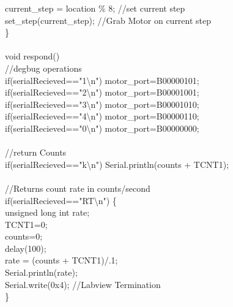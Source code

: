 {\tabto*{.5cm}	current\_step = location \% 8; \tabto*{7.5cm} //set current step\\
\tabto*{.5cm}	set\_step(current\_step);\tabto*{7.5cm} //Grab Motor on current step\\		
\}\\
\\
void respond() {\\
\tabto*{.5cm}\tabto*{7.5cm}	//degbug operations\\
\tabto*{.5cm}	if(serialRecieved=="1\textbackslash n") motor\_port=B00000101;\\
\tabto*{.5cm}	if(serialRecieved=="2\textbackslash n") motor\_port=B00001001;\\
\tabto*{.5cm}	if(serialRecieved=="3\textbackslash n") motor\_port=B00001010;\\
\tabto*{.5cm}	if(serialRecieved=="4\textbackslash n") motor\_port=B00000110;\\
\tabto*{.5cm}	if(serialRecieved=="0\textbackslash n") motor\_port=B00000000;\\
\\	
\tabto*{.5cm}	//return Counts\\
\tabto*{.5cm}	if(serialRecieved=="k\textbackslash n") Serial.println(counts + TCNT1);  \\
\\	
\tabto*{.5cm}	//Returns count rate in counts/second\\
\tabto*{.5cm}	if(serialRecieved=="RT\textbackslash n") \{  \\		
\tabto*{1cm}		unsigned long int rate;\\
\tabto*{1cm}		TCNT1=0;\\
\tabto*{1cm}		counts=0;\\
\tabto*{1cm}		delay(100);\\
\tabto*{1cm}		rate = (counts + TCNT1)/.1;\\		
\tabto*{1cm}		Serial.println(rate);\\
\tabto*{1cm}		Serial.write(0x4);\tabto*{7.5cm}  //Labview Termination\\
\tabto*{.5cm}	\}\\
	
}}
